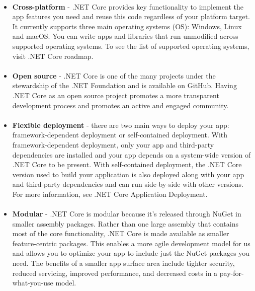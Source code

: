 \documentclass[../thesis.tex]{subfiles}
\begin{document}
\paragraph{}
\begin{itemize}
  \item \textbf{Cross-platform} - .NET Core provides key functionality to implement the app features you need and reuse this code regardless of your platform target. It currently supports three main operating systems (OS): Windows, Linux and macOS. You can write apps and libraries that run unmodified across supported operating systems. To see the list of supported operating systems, visit .NET Core roadmap.
  \paragraph{}
  \item \textbf{Open source} - .NET Core is one of the many projects under the stewardship of the .NET Foundation and is available on GitHub. Having .NET Core as an open source project promotes a more transparent development process and promotes an active and engaged community.
  \paragraph{}
  \item \textbf{Flexible deployment} - there are two main ways to deploy your app: framework-dependent deployment or self-contained deployment. With framework-dependent deployment, only your app and third-party dependencies are installed and your app depends on a system-wide version of .NET Core to be present. With self-contained deployment, the .NET Core version used to build your application is also deployed along with your app and third-party dependencies and can run side-by-side with other versions. For more information, see .NET Core Application Deployment.
  \paragraph{}
  \item \textbf{Modular} - .NET Core is modular because it's released through NuGet in smaller assembly packages. Rather than one large assembly that contains most of the core functionality, .NET Core is made available as smaller feature-centric packages. This enables a more agile development model for us and allows you to optimize your app to include just the NuGet packages you need. The benefits of a smaller app surface area include tighter security, reduced servicing, improved performance, and decreased costs in a pay-for-what-you-use model.
\end{itemize}
\end{document}

